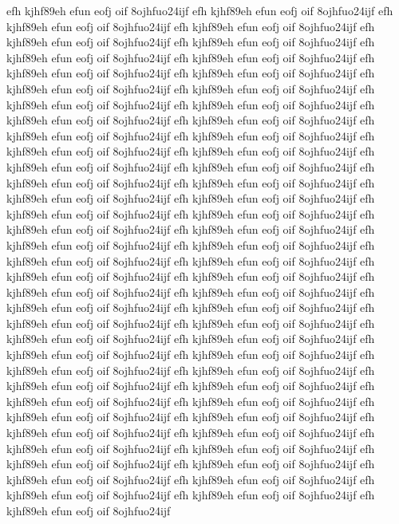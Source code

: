 \documentclass[a4paper,12pt]{book} %
\begin{document}
efh kjhf89eh efun eofj oif 8ojhfuo24ijf
efh kjhf89eh efun eofj oif 8ojhfuo24ijf
efh kjhf89eh efun eofj oif 8ojhfuo24ijf
efh kjhf89eh efun eofj oif 8ojhfuo24ijf
efh kjhf89eh efun eofj oif 8ojhfuo24ijf
efh kjhf89eh efun eofj oif 8ojhfuo24ijf
efh kjhf89eh efun eofj oif 8ojhfuo24ijf
efh kjhf89eh efun eofj oif 8ojhfuo24ijf
efh kjhf89eh efun eofj oif 8ojhfuo24ijf
efh kjhf89eh efun eofj oif 8ojhfuo24ijf
efh kjhf89eh efun eofj oif 8ojhfuo24ijf
efh kjhf89eh efun eofj oif 8ojhfuo24ijf
efh kjhf89eh efun eofj oif 8ojhfuo24ijf
efh kjhf89eh efun eofj oif 8ojhfuo24ijf
efh kjhf89eh efun eofj oif 8ojhfuo24ijf
efh kjhf89eh efun eofj oif 8ojhfuo24ijf
efh kjhf89eh efun eofj oif 8ojhfuo24ijf
efh kjhf89eh efun eofj oif 8ojhfuo24ijf
efh kjhf89eh efun eofj oif 8ojhfuo24ijf
efh kjhf89eh efun eofj oif 8ojhfuo24ijf
efh kjhf89eh efun eofj oif 8ojhfuo24ijf
efh kjhf89eh efun eofj oif 8ojhfuo24ijf
efh kjhf89eh efun eofj oif 8ojhfuo24ijf
efh kjhf89eh efun eofj oif 8ojhfuo24ijf
efh kjhf89eh efun eofj oif 8ojhfuo24ijf
efh kjhf89eh efun eofj oif 8ojhfuo24ijf
efh kjhf89eh efun eofj oif 8ojhfuo24ijf
efh kjhf89eh efun eofj oif 8ojhfuo24ijf
efh kjhf89eh efun eofj oif 8ojhfuo24ijf
efh kjhf89eh efun eofj oif 8ojhfuo24ijf
efh kjhf89eh efun eofj oif 8ojhfuo24ijf
efh kjhf89eh efun eofj oif 8ojhfuo24ijf
efh kjhf89eh efun eofj oif 8ojhfuo24ijf
efh kjhf89eh efun eofj oif 8ojhfuo24ijf
efh kjhf89eh efun eofj oif 8ojhfuo24ijf
efh kjhf89eh efun eofj oif 8ojhfuo24ijf
efh kjhf89eh efun eofj oif 8ojhfuo24ijf
efh kjhf89eh efun eofj oif 8ojhfuo24ijf
efh kjhf89eh efun eofj oif 8ojhfuo24ijf
efh kjhf89eh efun eofj oif 8ojhfuo24ijf
efh kjhf89eh efun eofj oif 8ojhfuo24ijf
efh kjhf89eh efun eofj oif 8ojhfuo24ijf
efh kjhf89eh efun eofj oif 8ojhfuo24ijf
efh kjhf89eh efun eofj oif 8ojhfuo24ijf
efh kjhf89eh efun eofj oif 8ojhfuo24ijf
efh kjhf89eh efun eofj oif 8ojhfuo24ijf
efh kjhf89eh efun eofj oif 8ojhfuo24ijf
efh kjhf89eh efun eofj oif 8ojhfuo24ijf
efh kjhf89eh efun eofj oif 8ojhfuo24ijf
efh kjhf89eh efun eofj oif 8ojhfuo24ijf
efh kjhf89eh efun eofj oif 8ojhfuo24ijf
efh kjhf89eh efun eofj oif 8ojhfuo24ijf
efh kjhf89eh efun eofj oif 8ojhfuo24ijf
efh kjhf89eh efun eofj oif 8ojhfuo24ijf
efh kjhf89eh efun eofj oif 8ojhfuo24ijf
efh kjhf89eh efun eofj oif 8ojhfuo24ijf
efh kjhf89eh efun eofj oif 8ojhfuo24ijf
efh kjhf89eh efun eofj oif 8ojhfuo24ijf
efh kjhf89eh efun eofj oif 8ojhfuo24ijf
efh kjhf89eh efun eofj oif 8ojhfuo24ijf
efh kjhf89eh efun eofj oif 8ojhfuo24ijf
efh kjhf89eh efun eofj oif 8ojhfuo24ijf
efh kjhf89eh efun eofj oif 8ojhfuo24ijf
efh kjhf89eh efun eofj oif 8ojhfuo24ijf
efh kjhf89eh efun eofj oif 8ojhfuo24ijf
\end{document}
